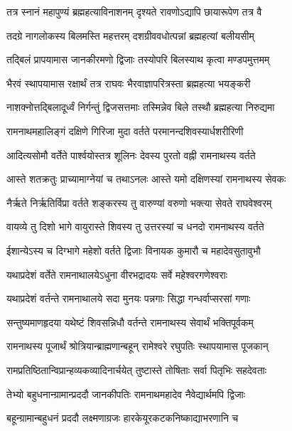 \twolineshloka
{तत्र स्नानं महापुण्यं ब्रह्महत्याविनाशनम्}
{दृश्यते रावणोऽद्यापि छायारूपेण तत्र वै}%

\twolineshloka
{तदग्रे नागलोकस्य बिलमस्ति महत्तरम्}
{दशग्रीववधोत्पन्नां ब्रह्महत्यां बलीयसीम्}%

\twolineshloka
{तद्बिलं प्रापयामास जानकीरमणो द्विजाः}
{तस्योपरि बिलस्याथ कृत्वा मण्डपमुत्तमम्}%

\twolineshloka
{भैरवं स्थापयामास रक्षार्थं तत्र राघवः}
{भैरवाज्ञापरित्रस्ता ब्रह्महत्या भयङ्करी}%

\twolineshloka
{नाशक्नोत्तद्बिलादूर्ध्वं निर्गन्तुं द्विजसत्तमाः}
{तस्मिन्नेव बिले तस्थौ ब्रह्महत्या निरुद्यमा}%

\twolineshloka
{रामनाथमहालिङ्गं दक्षिणे गिरिजा मुदा}
{वर्तते परमानन्दशिवस्यार्धशरीरिणी}%

\twolineshloka
{आदित्यसोमौ वर्तेते पार्श्वयोस्तत्र शूलिनः}
{देवस्य पुरतो वह्नी रामनाथस्य वर्तते}%

\twolineshloka
{आस्ते शतक्रतुः प्राच्यामाग्नेयां च तथाऽनलः}
{आस्ते यमो दक्षिणस्यां रामनाथस्य सेवकः}%

\twolineshloka
{नैर्ऋते निर्ऋतिर्विप्रा वर्तते शङ्करस्य तु}
{वारुण्यां वरुणो भक्त्या सेवते राघवेश्वरम्}%

\twolineshloka
{वायव्ये तु दिशो भागे वायुरास्ते शिवस्य तु}
{उत्तरस्यां च धनदो रामनाथस्य वर्तते}%

\twolineshloka
{ईशान्येऽस्य च दिग्भागे महेशो वर्तते द्विजाः}
{विनायक कुमारौ च महादेवसुतावुभौ}%

\twolineshloka
{यथाप्रदेशं वर्तेते रामनाथालयेऽधुना}
{वीरभद्रादयः सर्वे महेश्वरगणेश्वराः}%

\twolineshloka
{यथाप्रदेशं वर्तन्ते रामनाथालये सदा}
{मुनयः पन्नगाः सिद्धा गन्धर्वाप्सरसां गणाः}%

\twolineshloka
{सन्तुष्यमाणहृदया यथेष्टं शिवसन्निधौ}
{वर्तन्ते रामनाथस्य सेवार्थं भक्तिपूर्वकम्}%

\twolineshloka
{रामनाथस्य पूजार्थं श्रोत्रियान्ब्राह्मणान्बहून्}
{रामेश्वरे रघुपतिः स्थापयामास पूजकान्}%

\twolineshloka
{रामप्रतिष्ठितान्विप्रान्हव्यकव्यादिनार्चयेत्}
{तुष्टास्ते तोषिताः सर्वा पितृभिः सहदेवताः}%

\twolineshloka
{तेभ्यो बहुधनान्ग्रामान्प्रददौ जानकीपतिः}
{रामनाथमहादेव नैवेद्यार्थमपि द्विजाः}%

\twolineshloka
{बहून्ग्रामान्बहुधनं प्रददौ लक्ष्मणाग्रजः}
{हारकेयूरकटकनिष्काद्याभरणानि च}%

